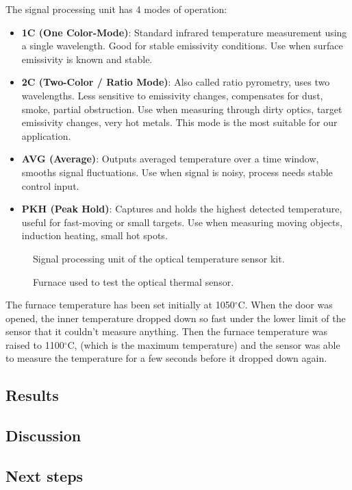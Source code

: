 The signal processing unit has 4 modes of operation:

\begin{itemize}
    \item \textbf{1C (One Color-Mode)}: Standard infrared temperature measurement using a single wavelength. Good for stable emissivity conditions. Use when surface emissivity is known and stable.
    \item \textbf{2C (Two-Color / Ratio Mode)}: Also called ratio pyrometry, uses two wavelengths. Less sensitive to emissivity changes, compensates for dust, smoke, partial obstruction. Use when measuring through dirty optics, target emissivity changes, very hot metals. This mode is the most suitable for our application.
    \item \textbf{AVG (Average)}: Outputs averaged temperature over a time window, smooths signal fluctuations. Use when signal is noisy, process needs stable control input.
    \item \textbf{PKH (Peak Hold)}: Captures and holds the highest detected temperature, useful for fast-moving or small targets. Use when measuring moving objects, induction heating, small hot spots.
\end{itemize}



\vspace{0mm}
\begin{figure}[H]
    \centering
        
        \caption{Signal processing unit of the optical temperature sensor kit.}
        \label{signal_processing_unit}
\end{figure}
\vspace{0mm}

\vspace{0mm}
\begin{figure}[H]
    \centering
        
        \caption{Furnace used to test the optical thermal sensor.}
        \label{furnace_test}
\end{figure}
\vspace{0mm}

The furnace temperature has been set initially at 1050$^\circ$C. When the door was opened, the inner temperature dropped down so fast under the lower limit of the sensor that it couldn't measure anything. Then the furnace temperature was raised to 1100$^\circ$C, (which is the maximum temperature) and the sensor was able to measure the temperature for a few seconds before it dropped down again.

                                      
\subsection{Results}

\subsection{Discussion}

\subsection{Next steps}



